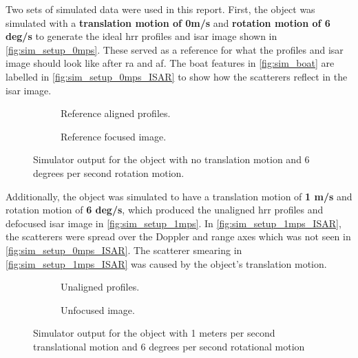 \documentclass[class=report,11pt,crop=false]{standalone}
\begin{document}
    Two sets of simulated data were used in this report. First, the object was simulated with a \textbf{ translation motion of 0m/s} and \textbf{rotation motion of 6 deg/s} to generate the ideal \gls{hrr} profiles and \gls{isar} image shown in \autoref{fig:sim_setup_0mps}. These served as a reference for what the profiles and \gls{isar} image should look like after \gls{ra} and \gls{af}. The boat features in \autoref{fig:sim_boat} are labelled in \autoref{fig:sim_setup_0mps_ISAR} to show how the scatterers reflect in the \gls{isar} image.

    \begin{figure}[H]
        \centering
        \begin{subfigure}{0.4\linewidth}
            \centering
            \resizebox{\linewidth}{!}{}
            \caption{Reference aligned profiles.}\label{fig:sim_setup_0mps_HRRP}
        \end{subfigure}
        \hspace{1cm}
        \begin{subfigure}{0.4\linewidth}
            \centering
            \resizebox{\linewidth}{!}{}
            \caption{Reference focused image.}\label{fig:sim_setup_0mps_ISAR}
        \end{subfigure}
        \caption{Simulator output for the object with no translation motion and 6 degrees per second rotation motion. }\label{fig:sim_setup_0mps}
    \end{figure}
            
    Additionally, the object was simulated to have a translation motion of \textbf{1 m/s} and rotation motion of \textbf{6 deg/s}, which produced the unaligned \gls{hrr} profiles and defocused \gls{isar} image in \autoref{fig:sim_setup_1mps}. In \autoref{fig:sim_setup_1mps_ISAR}, the scatterers were spread over the Doppler and range axes which was not seen in \autoref{fig:sim_setup_0mps_ISAR}. The scatterer smearing in \autoref{fig:sim_setup_1mps_ISAR} was caused by the object's translation motion.

    \begin{figure}[H]
        \centering
        \begin{subfigure}{0.4\linewidth}
            \centering
            \resizebox{\linewidth}{!}{}
            \caption{Unaligned profiles.}\label{fig:sim_setup_1mps_HRRP}
        \end{subfigure}
        \hspace{1cm}
        \begin{subfigure}{0.4\linewidth}
            \centering
            \resizebox{\linewidth}{!}{}
            \caption{Unfocused image.}\label{fig:sim_setup_1mps_ISAR}
        \end{subfigure}
        \caption{Simulator output for the object with 1 meters per second translational motion and 6 degrees per second rotational motion  \label{fig:sim_setup_1mps}}
    \end{figure}
    
\end{document}
